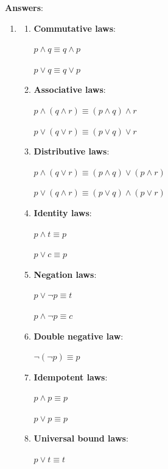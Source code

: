 \documentclass[letterpaper]{article}
\begin{document}
    \noindent \textbf{Answers}:

    
    \begin{enumerate}
        \item
        \begin{enumerate}
            \item \textbf{Commutative laws}:
            
            $p \land q \equiv q \land p$
            
            $p \lor q \equiv q \lor p$
            
            \item \textbf{Associative laws}:
            
            $p \land (q \land r) \equiv (p \land q) \land r$

            $p \lor (q \lor r) \equiv (p \lor q) \lor r$
            
            \item \textbf{Distributive laws}:
            
            $p \land (q \lor r) \equiv (p \land q)\lor(p \land r)$

            $p \lor (q \land r) \equiv (p \lor q)\land(p \lor r)$
            
            \item \textbf{Identity laws}:
            
            $p \land t \equiv p$

            $p \lor c \equiv p$
            
            \item \textbf{Negation laws}:
            
            $p \lor \neg p \equiv t$

            $p \land \neg p \equiv c$
            
            \item \textbf{Double negative law}:
            
            $\neg(\neg p) \equiv p$
            
            \item \textbf{Idempotent laws}:
            
            $p \land p \equiv p$

            $p \lor p \equiv p$
            
            \item \textbf{Universal bound laws}:
            
            $p \lor t \equiv t$


\end{enumerate}
\end{enumerate}
\end{document}
